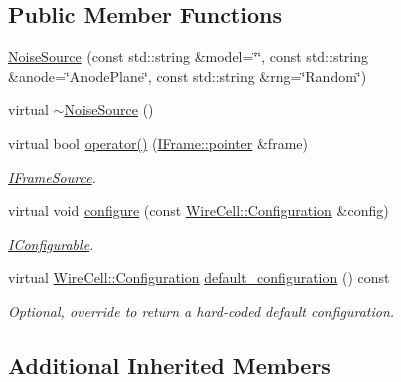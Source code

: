 \subsection*{Public Member Functions}
\begin{DoxyCompactItemize}
\item 
\hyperlink{class_wire_cell_1_1_gen_1_1_noise_source_acad852532f7af1a4c8cb0cc7dde0bbf6}{Noise\+Source} (const std\+::string \&model=\char`\"{}\char`\"{}, const std\+::string \&anode=\char`\"{}Anode\+Plane\char`\"{}, const std\+::string \&rng=\char`\"{}Random\char`\"{})
\item 
virtual \hyperlink{class_wire_cell_1_1_gen_1_1_noise_source_a1d6e7d7939d9321cc3b71e76044644a8}{$\sim$\+Noise\+Source} ()
\item 
virtual bool \hyperlink{class_wire_cell_1_1_gen_1_1_noise_source_a68dbab9d5fb03dc6477ca1213c288799}{operator()} (\hyperlink{class_wire_cell_1_1_i_data_aff870b3ae8333cf9265941eef62498bc}{I\+Frame\+::pointer} \&frame)
\begin{DoxyCompactList}\small\item\em \hyperlink{class_wire_cell_1_1_i_frame_source}{I\+Frame\+Source}. \end{DoxyCompactList}\item 
virtual void \hyperlink{class_wire_cell_1_1_gen_1_1_noise_source_a047efbb1be0463d0910dde2e259bf971}{configure} (const \hyperlink{namespace_wire_cell_a9f705541fc1d46c608b3d32c182333ee}{Wire\+Cell\+::\+Configuration} \&config)
\begin{DoxyCompactList}\small\item\em \hyperlink{class_wire_cell_1_1_i_configurable}{I\+Configurable}. \end{DoxyCompactList}\item 
virtual \hyperlink{namespace_wire_cell_a9f705541fc1d46c608b3d32c182333ee}{Wire\+Cell\+::\+Configuration} \hyperlink{class_wire_cell_1_1_gen_1_1_noise_source_a866c0843c7030c5b26305439365b4de3}{default\+\_\+configuration} () const
\begin{DoxyCompactList}\small\item\em Optional, override to return a hard-\/coded default configuration. \end{DoxyCompactList}\end{DoxyCompactItemize}
\subsection*{Additional Inherited Members}


